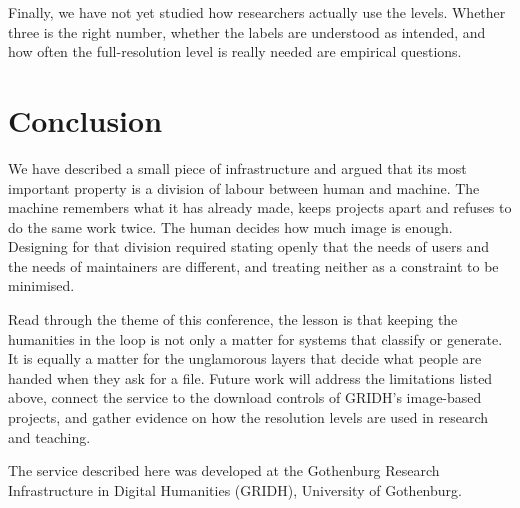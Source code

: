 \documentclass{dhnbpub}
\begin{document}
Finally, we have not yet studied how researchers actually use the
levels. Whether three is the right number, whether the labels are
understood as intended, and how often the full-resolution level is
really needed are empirical questions.

\section{Conclusion}

We have described a small piece of infrastructure and argued that its
most important property is a division of labour between human and
machine. The machine remembers what it has already made, keeps
projects apart and refuses to do the same work twice. The human decides
how much image is enough. Designing for that division required stating
openly that the needs of users and the needs of maintainers are
different, and treating neither as a constraint to be minimised.

Read through the theme of this conference, the lesson is that keeping
the humanities in the loop is not only a matter for systems that
classify or generate. It is equally a matter for the unglamorous layers
that decide what people are handed when they ask for a file. Future
work will address the limitations listed above, connect the service to
the download controls of GRIDH's image-based projects, and gather
evidence on how the resolution levels are used in research and
teaching.

\begin{acknowledgments}
  The service described here was developed at the Gothenburg Research
  Infrastructure in Digital Humanities (GRIDH), University of
  Gothenburg.
\end{acknowledgments}

\printbibliography
\end{document}
